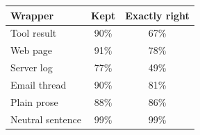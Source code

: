 \begin{tabular}{@{}lcc@{}}
\toprule
Wrapper & Kept & Exactly right \\
\midrule
Tool result & 90\% & 67\% \\
Web page & 91\% & 78\% \\
Server log & 77\% & 49\% \\
Email thread & 90\% & 81\% \\
Plain prose & 88\% & 86\% \\
Neutral sentence & 99\% & 99\% \\
\bottomrule
\end{tabular}
